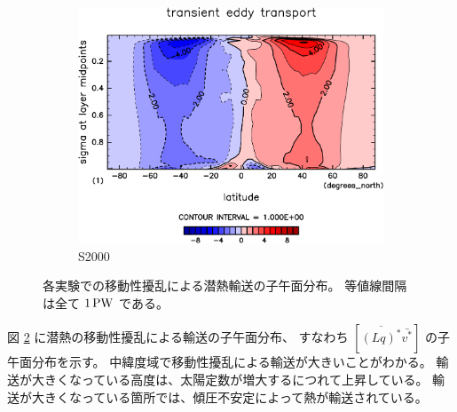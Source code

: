 \documentclass[body]{subfiles}
\begin{document}
\begin{figure}[t]
\begin{subfigure}{.4\textwidth}
		\includegraphics[width=\columnwidth]{S2000/MeriHeatTransTest@latentEn_TE,time=7300:7665-crop-rotate.pdf}
		\caption{S2000}\label{潜熱移動性擾乱S2000}
	\end{subfigure}
	\caption[各実験での移動性擾乱による潜熱輸送の子午面分布]{
		各実験での移動性擾乱による潜熱輸送の子午面分布。
		等値線間隔は全て \(1\hmu{PW}\) である。
	}\label{潜熱移動性擾乱}
\end{figure}

図 \ref{潜熱移動性擾乱} に潜熱の移動性擾乱による輸送の子午面分布、
すなわち \([\overline{(Lq)^*}\bar{v^*}]\) の子午面分布を示す。
中緯度域で移動性擾乱による輸送が大きいことがわかる。
輸送が大きくなっている高度は、太陽定数が増大するにつれて上昇している。
輸送が大きくなっている箇所では、傾圧不安定によって熱が輸送されている。
\end{document}
